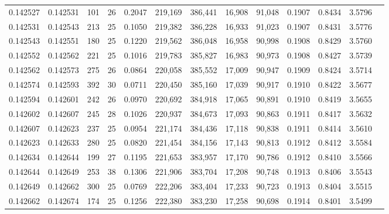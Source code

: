 \begin{tabular}{rrrrrrrrrrrrr}
0.142527 & 0.142531 & 101 &  26 &                                     0.2047 & 219,169 & 386,441 &  16,908 &  91,048 & 0.1907 & 0.8434 & 3.5796 \\
0.142531 & 0.142543 & 213 &  25 &                                     0.1050 & 219,382 & 386,228 &  16,933 &  91,023 & 0.1907 & 0.8431 & 3.5776 \\
0.142543 & 0.142551 & 180 &  25 &                                     0.1220 & 219,562 & 386,048 &  16,958 &  90,998 & 0.1908 & 0.8429 & 3.5760 \\
0.142552 & 0.142562 & 221 &  25 &                                     0.1016 & 219,783 & 385,827 &  16,983 &  90,973 & 0.1908 & 0.8427 & 3.5739 \\
0.142562 & 0.142573 & 275 &  26 &                                     0.0864 & 220,058 & 385,552 &  17,009 &  90,947 & 0.1909 & 0.8424 & 3.5714 \\
0.142574 & 0.142593 & 392 &  30 &                                     0.0711 & 220,450 & 385,160 &  17,039 &  90,917 & 0.1910 & 0.8422 & 3.5677 \\
0.142594 & 0.142601 & 242 &  26 &                                     0.0970 & 220,692 & 384,918 &  17,065 &  90,891 & 0.1910 & 0.8419 & 3.5655 \\
0.142602 & 0.142607 & 245 &  28 &                                     0.1026 & 220,937 & 384,673 &  17,093 &  90,863 & 0.1911 & 0.8417 & 3.5632 \\
0.142607 & 0.142623 & 237 &  25 &                                     0.0954 & 221,174 & 384,436 &  17,118 &  90,838 & 0.1911 & 0.8414 & 3.5610 \\
0.142623 & 0.142633 & 280 &  25 &                                     0.0820 & 221,454 & 384,156 &  17,143 &  90,813 & 0.1912 & 0.8412 & 3.5584 \\
0.142634 & 0.142644 & 199 &  27 &                                     0.1195 & 221,653 & 383,957 &  17,170 &  90,786 & 0.1912 & 0.8410 & 3.5566 \\
0.142644 & 0.142649 & 253 &  38 &                                     0.1306 & 221,906 & 383,704 &  17,208 &  90,748 & 0.1913 & 0.8406 & 3.5543 \\
0.142649 & 0.142662 & 300 &  25 &                                     0.0769 & 222,206 & 383,404 &  17,233 &  90,723 & 0.1913 & 0.8404 & 3.5515 \\
0.142662 & 0.142674 & 174 &  25 &                                     0.1256 & 222,380 & 383,230 &  17,258 &  90,698 & 0.1914 & 0.8401 & 3.5499 \\

\end{tabular}
